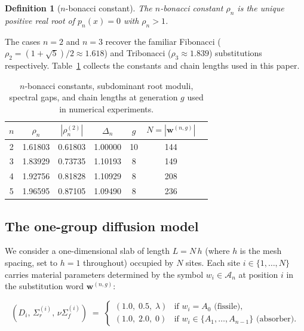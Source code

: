 \documentclass[11pt]{article}
\newtheorem{definition}[theorem]{Definition}
\newcommand{\rhon}{\rho_n}
\newcommand{\Sigmar}{\Sigma_r}
\newcommand{\nuSigmaf}{\nu\Sigma_f}
\begin{document}
\begin{definition}[$n$-bonacci constant]
  The \emph{$n$-bonacci constant} $\rhon$ is the unique positive real root
  of $p_n(x) = 0$ with $\rhon > 1$.
\end{definition}

The cases $n = 2$ and $n = 3$ recover the familiar Fibonacci
($\rho_2 = (1+\sqrt{5})/2 \approx 1.618$) and Tribonacci
($\rho_3 \approx 1.839$) substitutions respectively.
Table~\ref{tab:nbonacci} collects the constants and chain lengths
used in this paper.

\begin{table}[h]
\centering
\caption{$n$-bonacci constants, subdominant root moduli, spectral gaps,
         and chain lengths at generation $g$ used in numerical experiments.}
\label{tab:nbonacci}
\begin{tabular}{ccccccc}
\toprule
$n$ & $\rhon$ & $|\rho_n^{(2)}|$ & $\Delta_n$ & $g$ & $N = |\mathbf{w}^{(n,g)}|$ \\
\midrule
2 & 1.61803 & 0.61803 & 1.00000 & 10 & 144 \\
3 & 1.83929 & 0.73735 & 1.10193 &  8 & 149 \\
4 & 1.92756 & 0.81828 & 1.10929 &  8 & 208 \\
5 & 1.96595 & 0.87105 & 1.09490 &  8 & 236 \\
\bottomrule
\end{tabular}
\end{table}

\subsection{The one-group diffusion model}
\label{sec:diffusion}

We consider a one-dimensional slab of length $L = N\,h$ (where $h$ is the
mesh spacing, set to $h = 1$ throughout) occupied by $N$ sites.
Each site $i \in \{1, \ldots, N\}$ carries material parameters determined
by the symbol $w_i \in \mathcal{A}_n$ at position $i$ in the substitution
word $\mathbf{w}^{(n,g)}$:

\begin{equation}
  (D_i,\,\Sigmar^{(i)},\,\nuSigmaf^{(i)})
  \;=\;
  \begin{cases}
    (1.0,\;0.5,\;\lambda) & \text{if } w_i = A_0 \text{ (fissile)}, \\
    (1.0,\;2.0,\;0)       & \text{if } w_i \in \{A_1,\ldots,A_{n-1}\} \text{ (absorber)}.
  \end{cases}
  \label{eq:parammap}
\end{equation}
\end{document}
